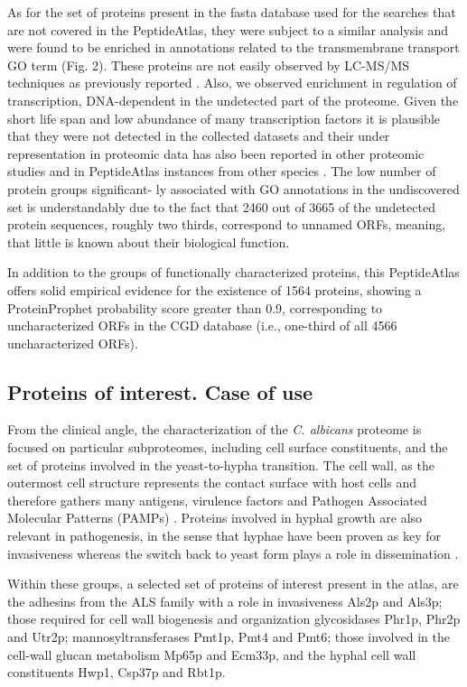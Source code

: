As for the set of proteins present in the fasta database used
for the searches that are not covered in the PeptideAtlas, they
were subject to a similar analysis and were found to be enriched
in annotations related to the transmembrane transport GO term
(Fig. 2). These proteins are not easily observed by LC-MS/MS
techniques as previously reported \citep{Gunaratne2013b}. Also, we observed
enrichment in regulation of transcription, DNA-dependent in the
undetected part of the proteome. Given the short life span and
low abundance of many transcription factors it is plausible that
they were not detected in the collected datasets and their under
representation in proteomic data has also been reported in other
proteomic studies and in PeptideAtlas instances from other
species \citep{Gunaratne2013b,Ding2013,Simicevic2013}. 
The low number of protein groups significant-
ly associated with GO annotations in the undiscovered set is
understandably due to the fact that 2460 out of 3665 of the
undetected protein sequences, roughly two thirds, correspond to
unnamed ORFs, meaning, that little is known about their
biological function.



In addition to the groups of functionally characterized proteins,
 this PeptideAtlas offers solid empirical evidence for the
existence of 1564 proteins, showing a ProteinProphet probability
score greater than 0.9, corresponding to uncharacterized ORFs in
the CGD database (i.e., one-third of all 4566 uncharacterized ORFs).


\subsection*{Proteins of interest. Case of use}


From the clinical angle, the characterization of the \textit{C. albicans}
proteome is focused on particular subproteomes, including
cell surface constituents, and the set of proteins involved in
the yeast-to-hypha transition. The cell wall, as the outermost
cell structure represents the contact surface with host cells
and therefore gathers many antigens, virulence factors and
Pathogen Associated Molecular Patterns (PAMPs) \citep{Vialas2012}. Proteins
involved in hyphal growth are also relevant in pathogenesis,
in the sense that hyphae have been proven as key for
invasiveness whereas the switch back to yeast form plays a
role in dissemination \citep{Saville2003}.


Within these groups, a selected set of proteins of interest
present in the atlas, are the adhesins from the ALS family with
a role in invasiveness Als2p and Als3p; those required for cell
wall biogenesis and organization glycosidases Phr1p, Phr2p
and Utr2p; mannosyltransferases Pmt1p, Pmt4 and Pmt6;
those involved in the cell-wall glucan metabolism Mp65p and
Ecm33p, and the hyphal cell wall constituents Hwp1, Csp37p
and Rbt1p.

